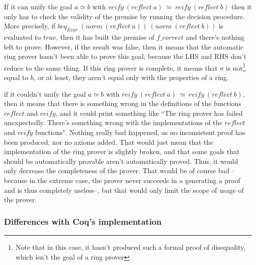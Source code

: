 \itemize
\item
If it can unify the goal $a \simeq b$ with $reify\ (reflect\ a)\ \simeq\ reify\ (reflect\ b)$ then it only has to check the validity of the premise by running the decision procedure. More precisely, if $beq_{Expr}\ (norm\ (reflect\ a))\ (norm\ (reflect\ b))$ is evaluated to $true$, then it has built the premise of $f\_correct$ and there's nothing left to prove. However, if the result was false, then it means that the automatic ring prover hasn't been able to prove this goal, because the LHS and RHS don't reduce to the same thing. If this ring prover is complete, it means that $a$ is not\footnote{Note that in this case, it hasn't produced such a formal proof of disequality, which isn't the goal of a ring prover} equal to $b$, or at least, they aren't equal only with the properties of a ring.
\item
if it couldn't unify the goal $a \simeq b$ with $reify\ (reflect\ a)\ \simeq\ reify\ (reflect\ b)$, then it means that there is something wrong in the definitions of the functions $reflect$ and $reify$, and it could print something like ``The ring prover has failed unexpectedly. There's something wrong with the implementations of the $reflect$ and $reify$ functions". Nothing really bad happened, as no inconsistent proof has been produced, nor no axioms added. That would just mean that the implementation of the ring prover is slightly broken, and that some goals that should be automatically provable aren't automatically proved. Thus, it would only decrease the completeness of the prover. That would be of course bad --because in the extreme case, the prover never succeeds in a generating a proof and is thus completely useless--, but that would only limit the scope of usage of the prover. \\

		\subsubsection{Differences with Coq's implementation}


